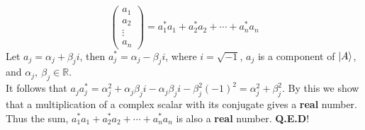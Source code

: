 \documentclass{report}
\DeclarePairedDelimiter\ket{\lvert}{\rangle}
\begin{document}
\begin{solution}
\begin{equation*}
\begin{pmatrix}
a_1 \\
a_2 \\
\vdots \\
a_n 
\end{pmatrix} = a_1^* a_1 + a_2^* a_2 + \cdots + a_n^* a_n
\end{equation*}
Let $a_j = \alpha_j + \beta_j i$, then $a_j^* = \alpha_j - \beta_j i$, where $i = \sqrt{-1}$, $a_j$ is a component of $\ket{A}$, and $\alpha_j,\:\beta_j \in \mathbb{R}$.\\
 It follows that $a_j a_j^* = \alpha_j^2 +\alpha_j \beta_j i - \alpha_j \beta_j i - \beta_j^2 (-1)^2 = \alpha_j^2 + \beta_j^2$. By this we show that a multiplication of a complex scalar with its conjugate gives a \textbf{real} number. Thus the sum, $a_1^* a_1 + a_2^* a_2 + \cdots + a_n^* a_n$ is also a \textbf{real} number. \textbf{Q.E.D}!
\end{solution}
\end{document}
